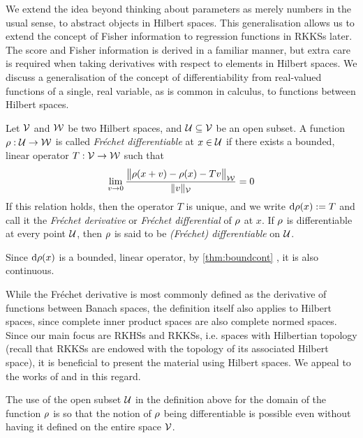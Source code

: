 We extend the idea beyond thinking about parameters as merely numbers in the usual sense, to abstract objects in Hilbert spaces. 
This generalisation allows us to extend the concept of Fisher information to regression functions in RKKSs later.
The score and Fisher information is derived in a familiar manner, but extra care is required when taking derivatives with respect to elements in Hilbert spaces.  
We discuss a generalisation of the concept of differentiability from real-valued functions of a single, real variable, as is common in calculus, to functions between Hilbert spaces.

\begin{definition}\label{def:frechet}
  Let ${\mathcal V}$ and ${\mathcal W}$ be two Hilbert spaces, and ${\mathcal U} \subseteq {\mathcal V}$ be an open subset.
  A function $\rho :{\mathcal U}\to{\mathcal W}$ is called \emph{Fréchet differentiable} at $x \in {\mathcal U}$ if there exists a bounded, linear operator $T:{\mathcal V}\to{\mathcal W}$ such that 
  \[
    \lim_{v\to 0} \frac{\big\Vert \rho(x+v) - \rho(x) - T v \big\Vert_{{\mathcal W}}}{\lVert v\rVert_{\mathcal V}} = 0
  \]
  If this relation holds, then the operator $T$ is unique, and we write $\text{d} \rho(x) := T$ and call it the \emph{Fréchet derivative} or \emph{Fréchet differential} of $\rho$ at $x$.
  If $\rho$ is differentiable at every point ${\mathcal U}$, then $\rho$ is said to be \emph{(Fréchet) differentiable} on ${\mathcal U}$.
\end{definition}

\begin{remark}
  Since $\text{d} \rho(x)$ is a bounded, linear operator, by \cref{thm:boundcont} , it is also continuous. 
\end{remark}

\begin{remark}
  While the Fréchet derivative is most commonly defined as the derivative of functions between Banach spaces,  the definition itself also applies to Hilbert spaces, since complete inner product spaces are also complete normed spaces.
  Since our main focus are RKHSs and RKKSs, i.e. spaces with Hilbertian topology (recall that RKKSs are endowed with the topology of its associated Hilbert space), it is beneficial to present the material using Hilbert spaces.
  We appeal to the works of \citet[Definition 3.6.5]{balakrishnan1981applied} and \citet[§6]{bouboulis2011extension} in this regard.
\end{remark}

\begin{remark}
  The use of the open subset ${\mathcal U}$ in the definition above for the domain of the function $\rho$ is so that the notion of $\rho$ being differentiable is possible even without having it defined on the entire space ${\mathcal V}$.
\end{remark}


